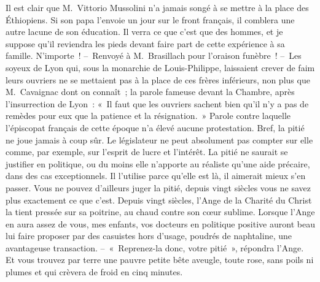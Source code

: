 \documentclass[french,twoside]{book} %
\newcommand{\astertri}{\medskip\par\centerline{\color{rubric}\large\selectfont{\syms ✻\,✻\,✻}}\medskip\par}%
\begin{document}
Il est clair que M. Vittorio Mussolini n’a jamais songé à se mettre à la place des Éthiopiens. Si son papa l’envoie un jour sur le front français, il comblera une autre lacune de son éducation. Il verra ce que c’est que des hommes, et je suppose qu’il reviendra les pieds devant faire part de cette expérience à sa famille. N’importe ! – Renvoyé à M. Brasillach pour l’oraison funèbre ! – Les soyeux de Lyon qui, sous la monarchie de Louis-Philippe, laissaient crever de faim leurs ouvriers ne se mettaient pas à la place de ces frères inférieurs, non plus que M. Cavaignac dont on connaît ; la parole fameuse devant la Chambre, après l’insurrection de Lyon : « Il faut que les ouvriers sachent bien qu’il n’y a pas de remèdes pour eux que la patience et la résignation. » Parole contre laquelle l’épiscopat français de cette époque n’a élevé aucune protestation. Bref, la pitié ne joue jamais à coup sûr. Le législateur ne peut absolument pas compter sur elle comme, par exemple, sur l’esprit de lucre et l’intérêt. La pitié ne saurait se justifier en politique, ou du moins elle n’apporte au réaliste qu’une aide précaire, dans des cas exceptionnels. Il l’utilise parce qu’elle est là, il aimerait mieux s’en passer. Vous ne pouvez d’ailleurs juger la pitié, depuis vingt siècles vous ne savez plus exactement ce que c’est. Depuis vingt siècles, l’Ange de la Charité du Christ la tient pressée sur sa poitrine, au chaud contre son cœur sublime. Lorsque l’Ange en aura assez de vous, mes enfants, vos docteurs en politique positive auront beau lui faire proposer par des casuistes hors d’usage, poudrés de naphtaline, une avantageuse transaction. – « Reprenez-la donc, votre pitié », répondra l’Ange. Et vous trouvez par terre une pauvre petite bête aveugle, toute rose, sans poils ni plumes et qui crèvera de froid en cinq minutes.\par
 \par

\astertri
\end{document}
